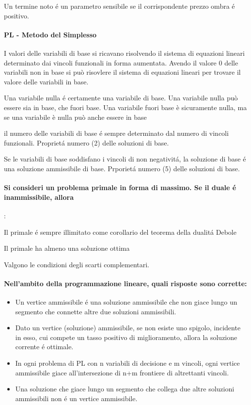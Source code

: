 \documentclass[12pt, a4paper, openany]{book}
\begin{document}
\affermazione
{Un termine noto é un parametro sensibile se il corrispondente prezzo ombra é positivo.}

\paragraph{PL - Metodo del Simplesso}

\affermazionetrue
{I valori delle variabili di base si ricavano risolvendo il sistema di equazioni lineari determinato dai vincoli funzionali in forma aumentata.}
{Avendo il valore 0 delle variabili non in base si può risovlere il sistema di equazioni lineari per trovare il valore delle variabili in base.}

\affermazionefalse
{Una variabile nulla é certamente una variabile di base.}
{Una variabile nulla può essere sia in base, che fuori base. Una variabile fuori base è sicuramente nulla,
ma se una variabile è nulla può anche essere in base}

\affermazionetrue
{il numero delle variabili di base é sempre determinato dal numero di vincoli funzionali.}
{Proprietá numero (2) delle soluzioni di base.}

\affermazionetrue
{Se le variabili di base soddisfano i vincoli di non negativitá, la soluzione di base é una soluzione ammissibile di base.}
{Prporietá numero (5) delle soluzioni di base.}

\paragraph{Si consideri un problema primale in forma di massimo. Se il duale é inammissibile, allora}:

\affermazione
{Il primale é sempre illimitato come corollario del teorema della dualitá Debole}

\affermazione
{Il primale ha almeno una soluzione ottima}

\affermazione
{Valgono le condizioni degli scarti complementari.}


\paragraph{Nell'ambito della programmazione lineare, quali risposte sono corrette:}
\begin{itemize}
    \item Un vertice ammissibile é una soluzione ammissibile che non giace lungo un segmento che connette altre due soluzioni ammissibili.
    \item Dato un vertice (soluzione) ammissibile, se non esiste uno spigolo, incidente in esso, cui compete un tasso positivo di miglioramento, allora la soluzione corrente é ottimale.
    \item In ogni problema di PL con n variabili di decisione e m vincoli, ogni vertice ammissibile giace all'intersezione di n+m frontiere di altrettanti vincoli.
    \item Una soluzione che giace lungo un segmento che collega due altre soluzioni ammissibili non é un vertice ammissibile.
\end{itemize}
\end{document}
